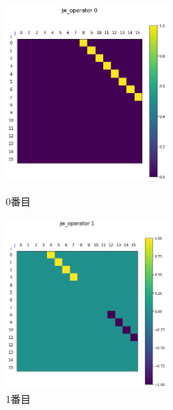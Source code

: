 \documentclass[a4paper, 10pt, dvipdfmx]{jlreq}
\begin{document}
\begin{figure}[htbp]
    \begin{minipage}{0.45\hsize}
        \begin{center}
            \includegraphics[width=60mm]{jw_operators/0.png}
        \end{center}
        \caption{0番目}
    \end{minipage}
    \begin{minipage}{0.45\hsize}
        \begin{center}
            \includegraphics[width=60mm]{jw_operators/1.png}
        \end{center}
        \caption{1番目}
    \end{minipage}
\end{figure}
\end{document}
